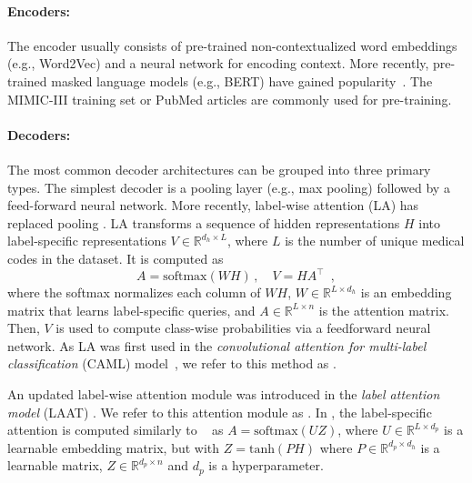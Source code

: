 {\paragraph{Encoders:}
The encoder usually consists of pre-trained non-contextualized word embeddings (e.g., Word2Vec) and a neural network for encoding context. More recently, pre-trained masked language models (e.g., BERT) have gained popularity~\parencite{tengReviewDeepNeural2022}. The MIMIC-III training set or PubMed articles are commonly used for pre-training.

\paragraph{Decoders:}
The most common decoder architectures can be grouped into three primary types. 
The simplest decoder is a pooling layer (e.g., max pooling) followed by a feed-forward neural network. More recently, label-wise attention (LA) \parencite{mullenbachExplainablePredictionMedical2018} has replaced pooling \parencite{vuLabelAttentionModel2020, liuEffectiveConvolutionalAttention2021, huangPLMICDAutomaticICD2022, liICDCodingClinical2020}. LA transforms a sequence of hidden representations $H$ into label-specific representations $V \in \mathbb{R}^{d_h \times L}$, where $L$ is the number of unique medical codes in the dataset.
It is computed as
\begin{equation}
    A = \text{softmax}(WH) \, , \quad
    V = HA^{\top} \enspace ,
\end{equation}
where the softmax normalizes each column of $WH$, $W \in \mathbb{R}^{L \times d_h}$ is an embedding matrix that learns label-specific queries, and $A \in \mathbb{R}^{L \times n}$ is the attention matrix. 
Then, $V$ is used to compute class-wise probabilities via a feedforward neural network. 
As LA was first used in the \textit{convolutional attention for multi-label classification} (CAML) model~\parencite{mullenbachExplainablePredictionMedical2018}, we refer to this method as \lacaml.

An updated label-wise attention module was introduced in the \textit{label attention model} (LAAT) \parencite{vuLabelAttentionModel2020}. We refer to this attention module as \lalaat. In \lalaat, the label-specific attention is computed similarly to  \lacaml~ as $A = \text{softmax}(UZ)$, where $U \in \mathbb{R}^{L \times d_p}$ is a learnable embedding matrix, but with 
$Z = \text{tanh}(PH)$ 
where $P \in \mathbb{R}^{d_p \times d_h}$ is a learnable matrix, $Z \in \mathbb{R}^{d_p \times n}$ and $d_p$ is a hyperparameter.


}
